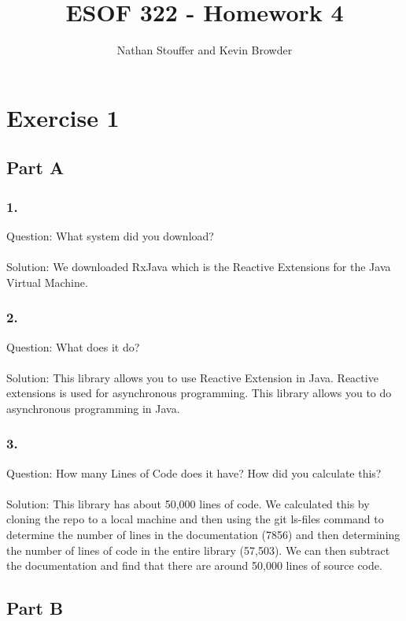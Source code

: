 \documentclass{article}
\begin{document}
	
\title{ESOF 322 - Homework 4}
\author{Nathan Stouffer and Kevin Browder}

\maketitle
\newpage

\section*{Exercise 1}

\subsection*{Part A}
\subsubsection*{1.}
Question: What system did you download?\\\\

Solution: We downloaded RxJava which is the Reactive Extensions for the Java Virtual Machine.
\subsubsection*{2.}
Question: What does it do?\\\\

Solution: This library allows you to use Reactive Extension in Java. Reactive extensions is used for asynchronous programming. This library allows you to do asynchronous programming in Java.
\subsubsection*{3.}
Question: How many Lines of Code does it have? How did you calculate this?\\\\
Solution: This library has about 50,000 lines of code. We calculated this by cloning the repo to a local machine and then using the git ls-files command to determine the number of lines in the documentation (7856) and then determining the number of lines of code in the entire library (57,503). We can then subtract the documentation and find that there are around 50,000 lines of source code.
\subsection*{Part B}
\end{document}
